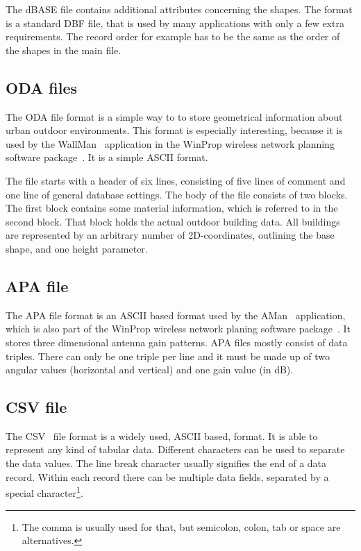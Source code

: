 The dBASE file contains additional attributes concerning the shapes. The format is a standard DBF file, that is used by many applications with only a few extra requirements. The record order for example has to be the same as the order of the shapes in the main file.

\subsection{ODA files}
The ODA file format is a simple way to to store geometrical information about urban outdoor environments. This format is especially interesting, because it is used by the WallMan~\cite{WallMan} application in the WinProp wireless network planning software package~\cite{WinProp}. It is a simple ASCII format.

The file starts with a header of six lines, consisting of five lines of comment and one line of general database settings. The body of the file consists of two blocks. The first block contains some material information, which is  referred to in the second block. That block holds the actual outdoor building data. All buildings are represented by an arbitrary number of 2D-coordinates, outlining the base shape, and one height parameter.

\subsection{APA file}
The APA file format is an ASCII based format used by the AMan~\cite{AMan} application, which is also part of the WinProp wireless network planing software package~\cite{WinProp}. It stores three dimensional antenna gain patterns. APA files mostly consist of data triples. There can only be one triple per line and it must be made up of two angular values (horizontal and vertical) and one gain value (in \unit{dB}).

\subsection{CSV file}
The CSV~\cite{CSV} file format is a widely used, ASCII based, format. It is able to represent any kind of tabular data. Different characters can be used to separate the data values. The line break character usually signifies the end of a data record. Within each record there can be multiple data fields, separated by a special character\footnote{The comma is usually used for that, but semicolon, colon, tab or space are alternatives.}.

